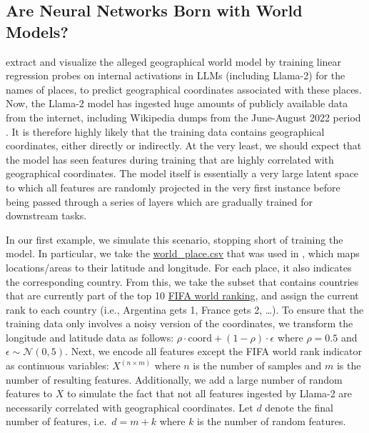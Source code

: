 \documentclass{article}
\theoremstyle{plain}
\theoremstyle{definition}
\theoremstyle{remark}
\begin{document}
\subsection{Are Neural Networks Born with World Models?}\label{example-deep-learning}

\citet{gurnee2023languagev2} extract and visualize the alleged geographical world model by training linear regression probes on internal activations in LLMs (including Llama-2) for the names of places, to predict geographical coordinates associated with these places. Now, the Llama-2 model has ingested huge amounts of publicly available data from the internet, including Wikipedia dumps from the June-August 2022 period \citep{touvron2023llama}. It is therefore highly likely that the training data contains geographical coordinates, either directly or indirectly. At the very least, we should expect that the model has seen features during training that are highly correlated with geographical coordinates. The model itself is essentially a very large latent space to which all features are randomly projected in the very first instance before being passed through a series of layers which are gradually trained for downstream tasks.

In our first example, we simulate this scenario, stopping short of training the model. In particular, we take the \href{https://github.com/wesg52/world-models/blob/main/data/entity_datasets/world_place.csv}{world\_place.csv} that was used in \citet{gurnee2023languagev2}, which maps locations/areas to their latitude and longitude. For each place, it also indicates the corresponding country. From this, we take the subset that contains countries that are currently part of the top 10 \href{https://www.fifa.com/fifa-world-ranking/men?dateId=id14142}{FIFA world ranking}, and assign the current rank to each country (i.e., Argentina gets 1, France gets 2, \ldots{}). To ensure that the training data only involves a noisy version of the coordinates, we transform the longitude and latitude data as follows: \(\rho \cdot \text{coord} + (1-\rho) \cdot \epsilon\) where \(\rho=0.5\) and \(\epsilon \sim \mathcal{N}(0, 5)\). Next, we encode all features except the FIFA world rank indicator as continuous variables: \(X^{(n \times m)}\) where \(n\) is the number of samples and \(m\) is the number of resulting features. Additionally, we add a large number of random features to \(X\) to simulate the fact that not all features ingested by Llama-2 are necessarily correlated with geographical coordinates. Let \(d\) denote the final number of features, i.e.~\(d=m+k\) where \(k\) is the number of random features.
\end{document}
